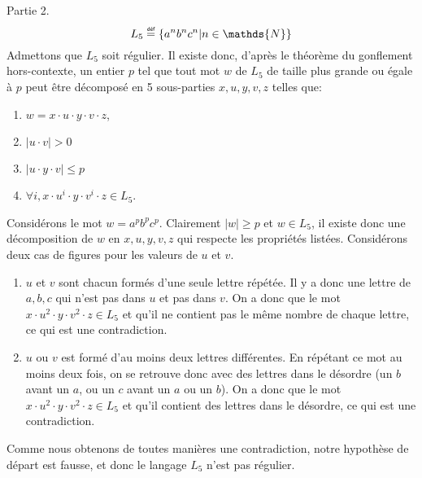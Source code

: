 \documentclass[12pt,french,a4paper]{article}
\newcommand\eqdef{\mathrel{\overset{\makebox[0pt]{\mbox{\normalfont\tiny\sffamily déf}}}{=}}}
\begin{document}
\begin{question}
\begin{enumerate}
\end{enumerate}
Partie 2.\\
$$L_5 \eqdef \{a^n b^n c^n|n\in \mathds{N}\}$$ 
Admettons que $L_5$ soit régulier.
Il existe donc, d'après le théorème du gonflement hors-contexte, un entier $p$ tel que tout mot $w$ de $L_5$ de taille plus grande ou égale à $p$ peut être décomposé en 5 sous-parties $x, u, y, v, z$ telles que:
\begin{enumerate}
\item $w = x \cdot u \cdot y \cdot v \cdot z$,
\item $|u \cdot v| > 0$
\item $|u \cdot y \cdot v| \leq p$
\item $\forall i, x \cdot u^i \cdot y \cdot v^i \cdot z \in L_5$. 
\end{enumerate}
Considérons le mot $w = a^p b^p c^p$. Clairement $|w| \geq p$ et $w \in L_5$, il existe donc une décomposition de $w$ en $x, u, y, v, z$ qui respecte les propriétés listées.
Considérons deux cas de figures pour les valeurs de $u$ et $v$.
\begin{enumerate}
\item $u$ et $v$ sont chacun formés d'une seule lettre répétée. Il y a donc une lettre de $a, b, c$ qui n'est pas dans $u$ et pas dans $v$.
On a donc que le mot $x \cdot u^2 \cdot y \cdot v^2 \cdot z \in L_5$ et qu'il ne contient pas le même nombre de chaque lettre, ce qui est une contradiction.
\item $u$ ou $v$ est formé d'au moins deux lettres différentes. En répétant ce mot au moins deux fois, on se retrouve donc avec des lettres dans le désordre (un $b$ avant un $a$, ou un $c$ avant un $a$ ou un $b$).
On a donc que le mot $x \cdot u^2 \cdot y \cdot v^2 \cdot z \in L_5$ et qu'il contient des lettres dans le désordre, ce qui est une contradiction.
\end{enumerate}
Comme nous obtenons de toutes manières une contradiction, notre hypothèse de départ est fausse, et donc le langage $L_5$ n'est pas régulier.

\end{question}
\end{document}
